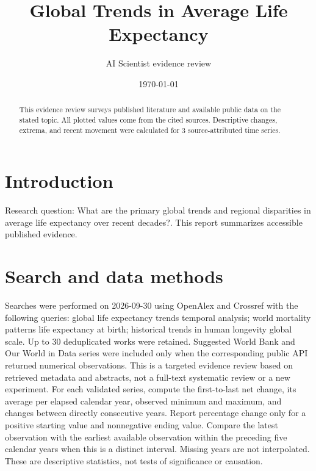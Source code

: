 \documentclass[10pt,a4paper]{article}
\title{Global Trends in Average Life Expectancy}
\author{AI Scientist evidence review}
\date{\today}
\begin{document}
\maketitle
\begin{abstract}
This evidence review surveys published literature and available public data on the stated topic. All plotted values come from the cited sources.
 Descriptive changes, extrema, and recent movement were calculated for 3 source-attributed time series.
\end{abstract}
\section{Introduction}
Research question: What are the primary global trends and regional disparities in average life expectancy over recent decades?. This report summarizes accessible published evidence.
\section{Search and data methods}
Searches were performed on 2026-09-30 using OpenAlex and Crossref with the following queries: global life expectancy trends temporal analysis; world mortality patterns life expectancy at birth; historical trends in human longevity global scale. Up to 30 deduplicated works were retained. Suggested World Bank and Our World in Data series were included only when the corresponding public API returned numerical observations. This is a targeted evidence review based on retrieved metadata and abstracts, not a full-text systematic review or a new experiment. For each validated series, compute the first-to-last net change, its average per elapsed calendar year, observed minimum and maximum, and changes between directly consecutive years. Report percentage change only for a positive starting value and nonnegative ending value. Compare the latest observation with the earliest available observation within the preceding five calendar years when this is a distinct interval. Missing years are not interpolated. These are descriptive statistics, not tests of significance or causation.
\end{document}
